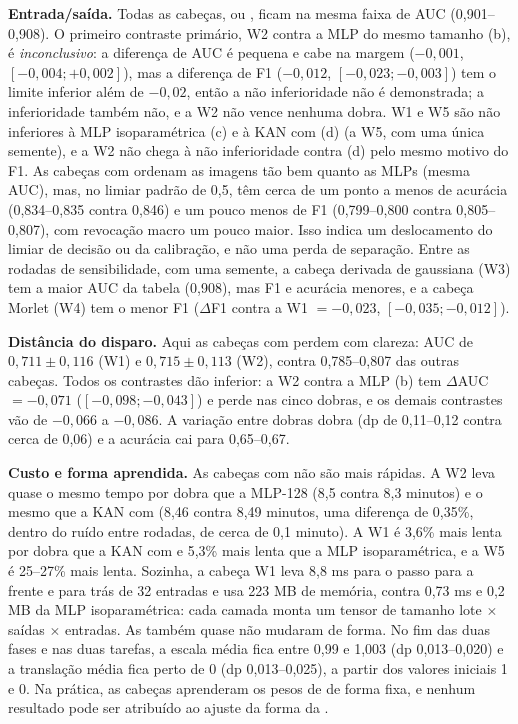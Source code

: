 \textbf{Entrada/saída.} Todas as cabeças,  ou , ficam na mesma faixa de AUC (0,901--0,908). O primeiro contraste primário, W2 contra a MLP do mesmo tamanho (b), é \emph{inconclusivo}: a diferença de AUC é pequena e cabe na margem ($-0{,}001$, $[-0{,}004; +0{,}002]$), mas a diferença de F1 ($-0{,}012$, $[-0{,}023; -0{,}003]$) tem o limite inferior além de $-0{,}02$, então a não inferioridade não é demonstrada; a inferioridade também não, e a W2 não vence nenhuma dobra. W1 e W5 são não inferiores à MLP isoparamétrica (c) e à KAN com  (d) (a W5, com uma única semente), e a W2 não chega à não inferioridade contra (d) pelo mesmo motivo do F1. As cabeças com  ordenam as imagens tão bem quanto as MLPs (mesma AUC), mas, no limiar padrão de 0,5, têm cerca de um ponto a menos de acurácia (0,834--0,835 contra 0,846) e um pouco menos de F1 (0,799--0,800 contra 0,805--0,807), com revocação macro um pouco maior. Isso indica um deslocamento do limiar de decisão ou da calibração, e não uma perda de separação. Entre as rodadas de sensibilidade, com uma semente, a cabeça derivada de gaussiana (W3) tem a maior AUC da tabela (0,908), mas F1 e acurácia menores, e a cabeça Morlet (W4) tem o menor F1 ($\Delta$F1 contra a W1 $= -0{,}023$, $[-0{,}035; -0{,}012]$).



\textbf{Distância do disparo.} Aqui as cabeças com  perdem com clareza: AUC de $0{,}711 \pm 0{,}116$ (W1) e $0{,}715 \pm 0{,}113$ (W2), contra 0,785--0,807 das outras cabeças. Todos os contrastes dão inferior: a W2 contra a MLP (b) tem $\Delta$AUC $= -0{,}071$ ($[-0{,}098; -0{,}043]$) e perde nas cinco dobras, e os demais contrastes vão de $-0{,}066$ a $-0{,}086$. A variação entre dobras dobra (dp de 0,11--0,12 contra cerca de 0,06) e a acurácia cai para 0,65--0,67.



\textbf{Custo e forma aprendida.} As cabeças com  não são mais rápidas. A W2 leva quase o mesmo tempo por dobra que a MLP-128 (8,5 contra 8,3 minutos) e o mesmo que a KAN com  (8,46 contra 8,49 minutos, uma diferença de 0,35\%, dentro do ruído entre rodadas, de cerca de 0,1 minuto). A W1 é 3,6\% mais lenta por dobra que a KAN com  e 5,3\% mais lenta que a MLP isoparamétrica, e a W5 é 25--27\% mais lenta. Sozinha, a cabeça W1 leva 8,8 ms para o passo para a frente e para trás de 32 entradas e usa 223 MB de memória, contra 0,73 ms e 0,2 MB da MLP isoparamétrica: cada camada monta um tensor de tamanho lote $\times$ saídas $\times$ entradas. As  também quase não mudaram de forma. No fim das duas fases e nas duas tarefas, a escala média fica entre 0,99 e 1,003 (dp 0,013--0,020) e a translação média fica perto de 0 (dp 0,013--0,025), a partir dos valores iniciais 1 e 0. Na prática, as cabeças aprenderam os pesos de  de forma fixa, e nenhum resultado pode ser atribuído ao ajuste da forma da .

